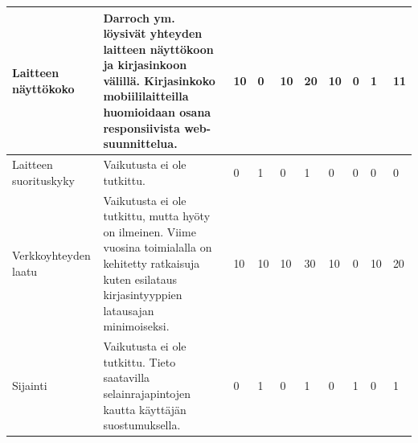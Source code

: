 \documentclass[finnish, 12pt, a4paper, elec, utf8, a-1b, online]{aaltothesis}
\begin{document}
{\begin{longtable}{p{2.5cm}|p{6cm}|p{0.5cm}p{0.5cm}p{0.5cm}|p{0.5cm}|p{0.5cm}p{0.5cm}p{0.5cm}|p{0.5cm}|}
        \midrule
        Laitteen näyttökoko                    & Darroch ym.~\cite{10.1007/11555261_23} löysivät yhteyden laitteen näyttökoon ja kirjasinkoon välillä. Kirjasinkoko mobiililaitteilla huomioidaan osana responsiivista web-suunnittelua.                                                                       & 10                                         & 0                                   & 10                                     & 20                           & 10                                              & 0                                         & 1                                         & 11                           \\
        \midrule
        Laitteen suorituskyky                  & Vaikutusta ei ole tutkittu.                                                                                                                                                                                                                                   & 0                                          & 1                                   & 0                                      & 1                            & 0                                               & 0                                         & 0                                         & 0                            \\
        \midrule
        Verkkoyhteyden laatu                   & Vaikutusta ei ole tutkittu, mutta hyöty on ilmeinen. Viime vuosina toimialalla on kehitetty ratkaisuja kuten esilataus~\cite{grigorik_2020} kirjasintyyppien latausajan minimoiseksi.                                                                         & 10                                         & 10                                  & 10                                     & 30                           & 10                                              & 0                                         & 10                                        & 20                           \\
        \midrule
        Sijainti                               & Vaikutusta ei ole tutkittu. Tieto saatavilla selainrajapintojen kautta käyttäjän suostumuksella.                                                                                                                                                              & 0                                          & 1                                   & 0                                      & 1                            & 0                                               & 1                                         & 0                                         & 1                            \\

\end{longtable}}
\end{document}
